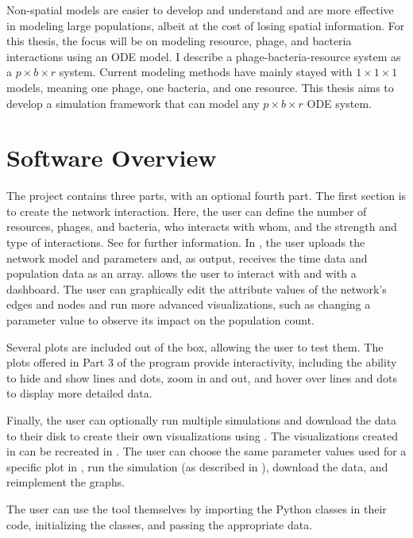 Non-spatial models are easier to develop and understand and are more effective in modeling large populations, albeit at the cost of losing spatial information. 
For this thesis, the focus will be on modeling resource, phage, and bacteria interactions using an ODE model. 
I describe a phage-bacteria-resource system as a $ p\times b\times r$ system. 
Current modeling methods have mainly stayed with $1\times 1 \times 1$ models, meaning one phage, one bacteria, and one resource. 
This thesis aims to develop a simulation framework that can model any $p\times b \times r$ ODE system. 

\section{Software Overview}
The project contains three parts, with an optional fourth part.
The first section is to create the network interaction. 
Here, the user can define the number of resources, phages, and bacteria, who interacts with whom, and the strength and type of interactions. See  for further information. 
In , the user uploads the network model and parameters and, as output, receives the time data and population data as an array. 
 allows the user to interact with  and  with a dashboard. 
The user can graphically edit the attribute values of the network's edges and nodes and run more advanced visualizations, such as changing a parameter value to observe its impact on the population count. 

Several plots are included out of the box, allowing the user to test them. 
The plots offered in Part 3 of the program provide interactivity, including the ability to hide and show lines and dots, zoom in and out, and hover over lines and dots to display more detailed data. 

Finally, the user can optionally run multiple simulations and download the data to their disk to create their own visualizations using . 
The visualizations created in  can be recreated in . 
The user can choose the same parameter values used for a specific plot in , run the simulation (as described in ), download the data, and reimplement the graphs. 

The user can use the tool themselves by importing the Python classes in their code, initializing the classes, and passing the appropriate data. 